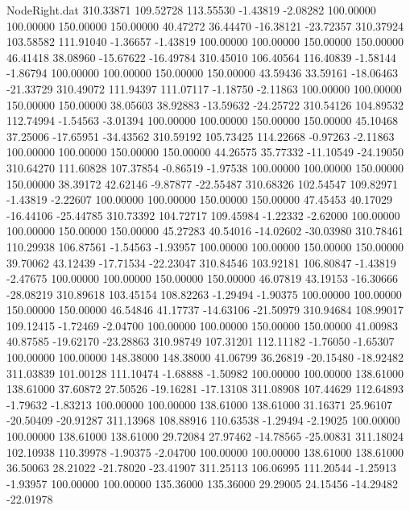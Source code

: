 \begin{filecontents}{NodeRight.dat}
 310.33871  109.52728  113.55530    -1.43819   -2.08282  100.00000  100.00000  150.00000  150.00000   40.47272   36.44470  -16.38121  -23.72357
 310.37924  103.58582  111.91040    -1.36657   -1.43819  100.00000  100.00000  150.00000  150.00000   46.41418   38.08960  -15.67622  -16.49784
 310.45010  106.40564  116.40839    -1.58144   -1.86794  100.00000  100.00000  150.00000  150.00000   43.59436   33.59161  -18.06463  -21.33729
 310.49072  111.94397  111.07117    -1.18750   -2.11863  100.00000  100.00000  150.00000  150.00000   38.05603   38.92883  -13.59632  -24.25722
 310.54126  104.89532  112.74994    -1.54563   -3.01394  100.00000  100.00000  150.00000  150.00000   45.10468   37.25006  -17.65951  -34.43562
 310.59192  105.73425  114.22668    -0.97263   -2.11863  100.00000  100.00000  150.00000  150.00000   44.26575   35.77332  -11.10549  -24.19050
 310.64270  111.60828  107.37854    -0.86519   -1.97538  100.00000  100.00000  150.00000  150.00000   38.39172   42.62146   -9.87877  -22.55487
 310.68326  102.54547  109.82971    -1.43819   -2.22607  100.00000  100.00000  150.00000  150.00000   47.45453   40.17029  -16.44106  -25.44785
 310.73392  104.72717  109.45984    -1.22332   -2.62000  100.00000  100.00000  150.00000  150.00000   45.27283   40.54016  -14.02602  -30.03980
 310.78461  110.29938  106.87561    -1.54563   -1.93957  100.00000  100.00000  150.00000  150.00000   39.70062   43.12439  -17.71534  -22.23047
 310.84546  103.92181  106.80847    -1.43819   -2.47675  100.00000  100.00000  150.00000  150.00000   46.07819   43.19153  -16.30666  -28.08219
 310.89618  103.45154  108.82263    -1.29494   -1.90375  100.00000  100.00000  150.00000  150.00000   46.54846   41.17737  -14.63106  -21.50979
 310.94684  108.99017  109.12415    -1.72469   -2.04700  100.00000  100.00000  150.00000  150.00000   41.00983   40.87585  -19.62170  -23.28863
 310.98749  107.31201  112.11182    -1.76050   -1.65307  100.00000  100.00000  148.38000  148.38000   41.06799   36.26819  -20.15480  -18.92482
 311.03839  101.00128  111.10474    -1.68888   -1.50982  100.00000  100.00000  138.61000  138.61000   37.60872   27.50526  -19.16281  -17.13108
 311.08908  107.44629  112.64893    -1.79632   -1.83213  100.00000  100.00000  138.61000  138.61000   31.16371   25.96107  -20.50409  -20.91287
 311.13968  108.88916  110.63538    -1.29494   -2.19025  100.00000  100.00000  138.61000  138.61000   29.72084   27.97462  -14.78565  -25.00831
 311.18024  102.10938  110.39978    -1.90375   -2.04700  100.00000  100.00000  138.61000  138.61000   36.50063   28.21022  -21.78020  -23.41907
 311.25113  106.06995  111.20544    -1.25913   -1.93957  100.00000  100.00000  135.36000  135.36000   29.29005   24.15456  -14.29482  -22.01978

\end{filecontents}
